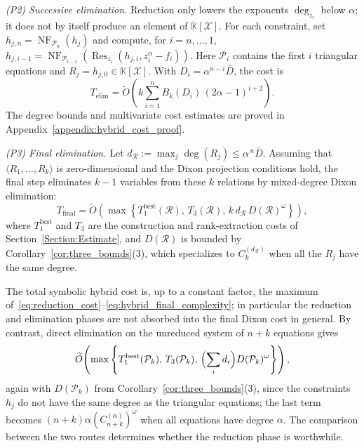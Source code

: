 \emph{(P2) Successive elimination.} Reduction only lowers the exponents $\deg_{z_i}$ below $\alpha$; it does not by itself produce an element of $\mathbb{K}[\mathcal{X}]$. For each constraint, set $h_{j,n}=\operatorname{NF}_{\mathcal{P}_n}(h_j)$ and compute, for $i=n,\ldots,1$, $h_{j,i-1}=\operatorname{NF}_{\mathcal{P}_{i-1}}(\operatorname{Res}_{z_i}(h_{j,i},z_i^\alpha-f_i))$. Here $\mathcal{P}_i$ contains the first $i$ triangular equations and $R_j=h_{j,0}\in\mathbb{K}[\mathcal{X}]$. With $D_i=\alpha^{n-i}\bar D$, the cost is
\begin{equation}
	T_{\text{elim}} = \widetilde{O}\!\left(k\sum_{i=1}^{n} B_k(D_i)\,(2\alpha-1)^{i+2}\right).
	\label{eq:successive_elim_cost}
\end{equation}
The degree bounds and multivariate cost estimates are proved in Appendix~\ref{appendix:hybrid_cost_proof}.

\emph{(P3) Final elimination.} Let $d_{\mathcal{R}} := \max_j \deg(R_j)\le \alpha^{\,n}\bar{D}$. Assuming that $\langle R_1,\ldots,R_k\rangle$ is zero-dimensional and the Dixon projection conditions hold, the final step eliminates $k-1$ variables from these $k$ relations by mixed-degree Dixon elimination:
\begin{equation}
	T_{\text{final}} = \widetilde{O}\!\left(\max\left\{T_{1}^{\mathrm{best}}(\mathcal{R}),\,T_3(\mathcal{R}),\,k\,d_{\mathcal{R}}\,D(\mathcal{R})^{\omega}\right\}\right),
	\label{eq:hybrid_final_complexity}
\end{equation}
where $T_{1}^{\mathrm{best}}$ and $T_3$ are the construction and rank-extraction costs of Section~\ref{Section:Estimate}, and $D(\mathcal{R})$ is bounded by Corollary~\ref{cor:three_bounds}(3), which specializes to $C_k^{(d_{\mathcal{R}})}$ when all the $R_j$ have the same degree.

The total symbolic hybrid cost is, up to a constant factor, the maximum of~\eqref{eq:reduction_cost}--\eqref{eq:hybrid_final_complexity}; in particular the reduction and elimination phases are not absorbed into the final Dixon cost in general. By contrast, direct elimination on the unreduced system of $n+k$ equations gives
\begin{equation}
	\widetilde{O}\!\left(\max\left\{T_{1}^{\mathrm{best}}(\mathcal{P}_k),\,T_3(\mathcal{P}_k),\,\Bigl(\sum_i d_i\Bigr)D(\mathcal{P}_k)^{\omega}\right\}\right),
	\label{eq:hybrid_direct_complexity}
\end{equation}
again with $D(\mathcal{P}_k)$ from Corollary~\ref{cor:three_bounds}(3), since the constraints $h_j$ do not have the same degree as the triangular equations; the last term becomes $(n+k)\alpha (C_{n+k}^{(\alpha)})^{\omega}$ when all equations have degree $\alpha$. The comparison between the two routes determines whether the reduction phase is worthwhile.


